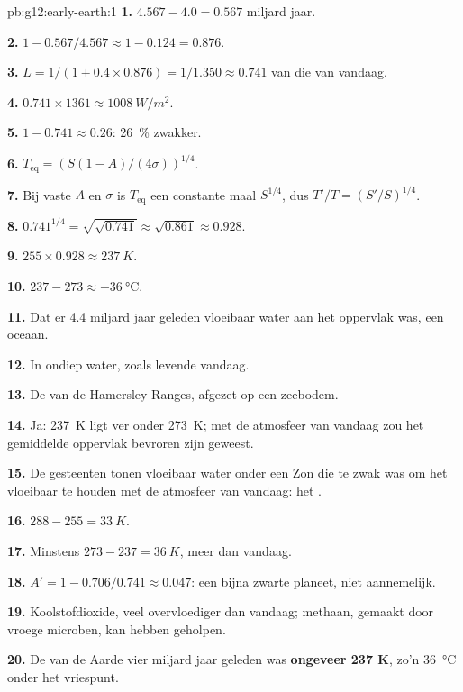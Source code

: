 \begin{solution}{pb:g12:early-earth:1}
\textbf{1.} $4.567 - 4.0 = 0.567$ miljard jaar.

\textbf{2.} $1 - 0.567/4.567 \approx 1 - 0.124 = 0.876$.

\textbf{3.} $L = 1/(1 + 0.4 \times 0.876) = 1/1.350 \approx 0.741$ van
die van vandaag.

\textbf{4.} $0.741 \times 1361 \approx \qty{1008}{W/m^2}$.

\textbf{5.} $1 - 0.741 \approx 0.26$: \qty{26}{\percent} zwakker.

\textbf{6.} $T_{\mathrm{eq}} = \left(S(1-A)/(4\sigma)\right)^{1/4}$.

\textbf{7.} Bij vaste $A$ en $\sigma$ is $T_{\mathrm{eq}}$ een constante maal
$S^{1/4}$, dus $T'/T = (S'/S)^{1/4}$.

\textbf{8.} $0.741^{1/4} = \sqrt{\sqrt{0.741}} \approx \sqrt{0.861} \approx
0.928$.

\textbf{9.} $255 \times 0.928 \approx \qty{237}{K}$.

\textbf{10.} $237 - 273 \approx \qty{-36}{\celsius}$.

\textbf{11.} Dat er 4.4 miljard jaar geleden vloeibaar water aan het oppervlak was, een
oceaan.

\textbf{12.} In ondiep water, zoals levende  vandaag.

\textbf{13.} De  van de Hamersley Ranges, afgezet
op een zeebodem.

\textbf{14.} Ja: \qty{237}{K} ligt ver onder \qty{273}{K}; met de atmosfeer van vandaag
zou het gemiddelde oppervlak bevroren zijn geweest.

\textbf{15.} De gesteenten tonen vloeibaar water onder een Zon die te zwak was om het
vloeibaar te houden met de atmosfeer van vandaag: het .

\textbf{16.} $288 - 255 = \qty{33}{K}$.

\textbf{17.} Minstens $273 - 237 = \qty{36}{K}$, meer dan vandaag.

\textbf{18.} $A' = 1 - 0.706/0.741 \approx 0.047$: een bijna zwarte planeet,
niet aannemelijk.

\textbf{19.} Koolstofdioxide, veel overvloediger dan vandaag; methaan, gemaakt door
vroege microben, kan hebben geholpen.

\textbf{20.} De  van de Aarde vier miljard jaar geleden was
\textbf{ongeveer 237 K}, zo'n \qty{36}{\celsius} onder het vriespunt.
\end{solution}
